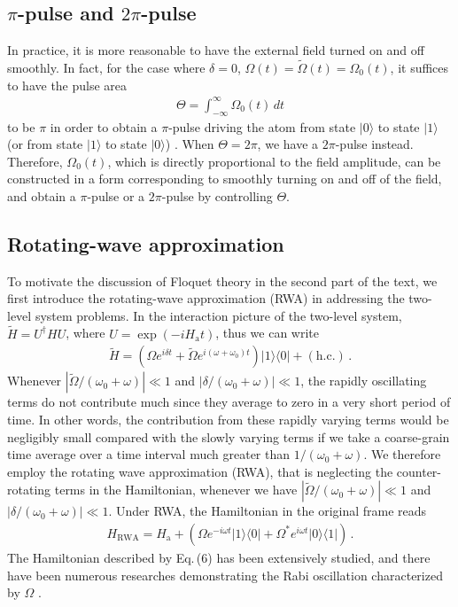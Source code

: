 \documentclass[reprint, amsmath, amssymb, aps]{revtex4-2}
\newcommand{\that}[1]{\widetilde{#1}}
\begin{document}
\subsection{$\pi$-pulse and $2\pi$-pulse}
In practice, it is more reasonable to have the external field turned on and off smoothly. In fact, for the case where $\delta = 0$, $\Omega(t) = \that{\Omega}(t) = \Omega_0(t)$, it suffices to have the pulse area
\begin{align}
\Theta = \int_{-\infty}^\infty \Omega_0(t) \, dt
\end{align}
to be $\pi$ in order to obtain a $\pi$-pulse driving the atom from state $|0\rangle$ to state $|1\rangle$ (or from state $|1\rangle$ to state $|0\rangle$) \cite{Berman}. When $\Theta = 2\pi$, we have a $2\pi$-pulse instead. Therefore, $\Omega_0(t)$, which is directly proportional to the field amplitude, can be constructed in a form corresponding to smoothly turning on and off of the field, and obtain a $\pi$-pulse or a $2\pi$-pulse by controlling $\Theta$. 

\subsection{Rotating-wave approximation}
To motivate the discussion of Floquet theory in the second part of the text, we first introduce the rotating-wave approximation (RWA) in addressing the two-level system problems. In the interaction picture of the two-level system, $\that{H} = U^\dagger H U$, where $U = \exp(-iH_\text{a}t)$, thus we can write
\begin{align}
\that{H} =  \left(\Omega e^{i\delta t} + \that{\Omega} e^{i(\omega+ \omega_0) t}\right) |1\rangle\langle 0| + (\text{h.c.})\,.
\end{align} 
Whenever $|\that{\Omega}/(\omega_0+\omega)| \ll 1$ and $|\delta /(\omega_0+\omega)|\ll 1$, the rapidly oscillating terms
do not contribute much since they average to zero in a very short period of time. In other words, the contribution from these rapidly varying terms would be negligibly
small compared with the slowly varying terms if we take a coarse-grain time average over a time interval much greater than
$1/(\omega_0 + \omega)$. We therefore employ the rotating wave approximation (RWA), that is neglecting the counter-rotating terms in the Hamiltonian, whenever we have $|\that{\Omega}/(\omega_0+\omega)| \ll 1$ and $|\delta /(\omega_0+\omega)|\ll 1$.
Under RWA, the Hamiltonian in the original frame reads
\begin{align}
H_{\text{RWA}} = H_\text{a} +  \left(\Omega e^{-i\omega t}|1\rangle\langle 0| + \Omega^* e^{i\omega t}|0\rangle \langle 1|\right)\,.
\end{align}
The Hamiltonian described by Eq.\,(6) has been extensively studied, and there have been numerous researches demonstrating the Rabi oscillation characterized by $\Omega$ \cite{Dudin, Gentile, Shandarova}. 
\end{document}
